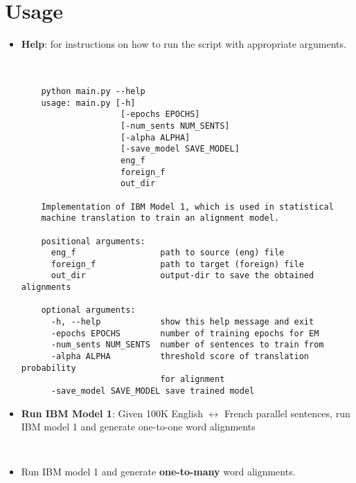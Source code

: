 \documentclass{article}[a4paper]
\begin{document}
\section{Usage}
\begin{itemize}
    \item \textbf{Help}: for instructions on how to run the script with appropriate arguments.\\
        \\
        \begin{lstlisting}[basicstyle=\small]
        
    python main.py --help
    usage: main.py [-h] 
                    [-epochs EPOCHS] 
                    [-num_sents NUM_SENTS] 
                    [-alpha ALPHA] 
                    [-save_model SAVE_MODEL]
                    eng_f 
                    foreign_f 
                    out_dir
    
    Implementation of IBM Model 1, which is used in statistical 
    machine translation to train an alignment model.
    
    positional arguments:
      eng_f                 path to source (eng) file
      foreign_f             path to target (foreign) file
      out_dir               output-dir to save the obtained alignments
    
    optional arguments:
      -h, --help            show this help message and exit
      -epochs EPOCHS        number of training epochs for EM
      -num_sents NUM_SENTS  number of sentences to train from
      -alpha ALPHA          threshold score of translation probability 
                            for alignment
      -save_model SAVE_MODEL save trained model
        \end{lstlisting}


        \item \textbf{Run IBM Model 1}: Given 100K English $\leftrightarrow$ French  parallel sentences, run IBM model 1 and generate one-to-one word alignments\\
            \begin{itemize}
                \begin{Verbatim}
                
                \end{Verbatim} 
            \end{itemize}
  
        \item Run IBM model 1 and generate \textbf{one-to-many} word alignments. \\

\end{itemize}
\end{document}

